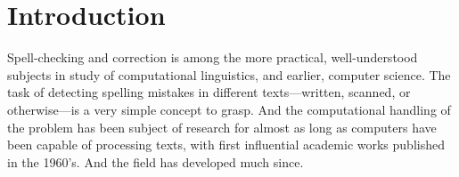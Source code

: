 \documentclass[officiallayout,draft]{unihelcompling}
\begin{document}

\chapter{Introduction}
\label{chap:introduction}

Spell-checking and correction is among the more practical, well-understood
subjects in study of computational linguistics, and earlier, computer science.
The task of detecting spelling mistakes in different texts---written, scanned,
or otherwise---is a very simple concept to grasp. And the computational
handling of the problem has been subject of research for almost as long as
computers have been capable of processing texts, with first influential
academic works published in the 1960's. And the field has developed much since.
\end{document}
